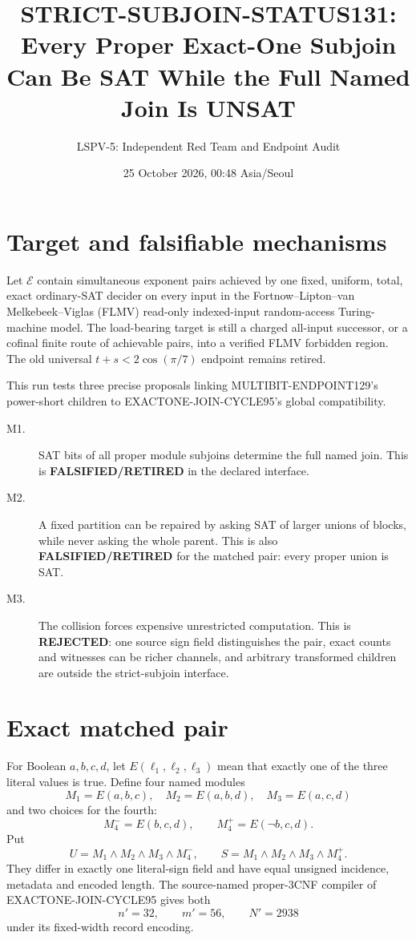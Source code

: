 \documentclass[11pt]{article}
\title{STRICT-SUBJOIN-STATUS131:\\
Every Proper Exact-One Subjoin Can Be SAT While the Full Named Join Is UNSAT}
\author{LSPV-5: Independent Red Team and Endpoint Audit}
\date{25 October 2026, 00:48 Asia/Seoul}
\begin{document}
\maketitle

\begin{center}
\end{center}

\section{Target and falsifiable mechanisms}
Let \(\mathcal E\) contain simultaneous exponent pairs achieved by one fixed,
uniform, total, exact ordinary-SAT decider on every input in the
Fortnow--Lipton--van Melkebeek--Viglas (FLMV) read-only indexed-input
random-access Turing-machine model.  The load-bearing target is still a
charged all-input successor, or a cofinal finite route of achievable pairs,
into a verified FLMV forbidden region.  The old universal
\(t+s<2\cos(\pi/7)\) endpoint remains retired.

This run tests three precise proposals linking MULTIBIT-ENDPOINT129's
power-short children to EXACTONE-JOIN-CYCLE95's global compatibility.
\begin{description}
\item[M1.] SAT bits of all proper module subjoins determine the full named
join.  This is \textbf{FALSIFIED/RETIRED} in the declared interface.
\item[M2.] A fixed partition can be repaired by asking SAT of larger unions
of blocks, while never asking the whole parent.  This is also
\textbf{FALSIFIED/RETIRED} for the matched pair: every proper union is SAT.
\item[M3.] The collision forces expensive unrestricted computation.
This is \textbf{REJECTED}: one source sign field distinguishes the pair, exact
counts and witnesses can be richer channels, and arbitrary transformed
children are outside the strict-subjoin interface.
\end{description}

\section{Exact matched pair}
For Boolean \(a,b,c,d\), let \(E(\ell_1,\ell_2,\ell_3)\) mean that exactly one
of the three literal values is true.  Define four named modules
\[
M_1=E(a,b,c),\quad M_2=E(a,b,d),\quad
M_3=E(a,c,d)
\]
and two choices for the fourth:
\[
M_4^-=E(b,c,d),\qquad M_4^+=E(\neg b,c,d).
\]
Put
\[
U=M_1\wedge M_2\wedge M_3\wedge M_4^-,
\qquad
S=M_1\wedge M_2\wedge M_3\wedge M_4^+.
\]
They differ in exactly one literal-sign field and have equal unsigned
incidence, metadata and encoded length.  The source-named proper-3CNF
compiler of EXACTONE-JOIN-CYCLE95 gives both
\[
n'=32,\qquad m'=56,\qquad N'=2938
\]
under its fixed-width record encoding.
\end{document}
